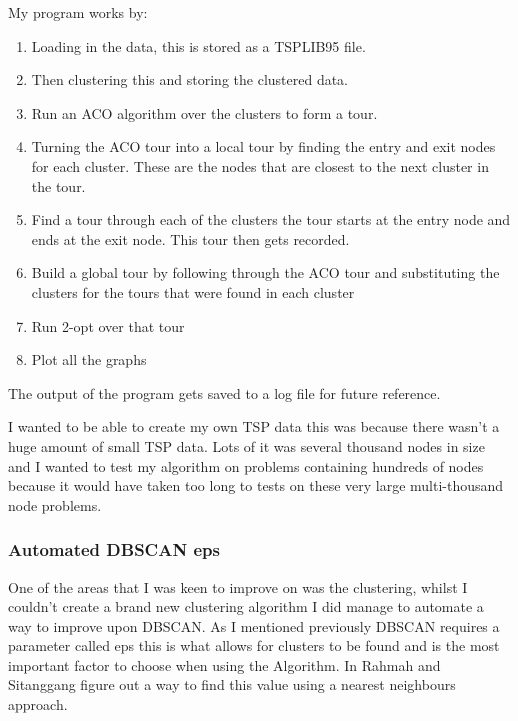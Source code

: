 My program works by:
\begin{enumerate}
    \item Loading in the data, this is stored as a TSPLIB95 file.
    \item Then clustering this and storing the clustered data.
    \item Run an ACO algorithm over the clusters to form a tour.
    \item Turning the ACO tour into a local tour by finding the entry and exit nodes for each cluster. These are the nodes that are closest to the next cluster in the tour.
    \item Find a tour through each of the clusters the tour starts at the entry node and ends at the exit node. This tour then gets recorded.
    \item Build a global tour by following through the ACO tour and substituting the clusters for the tours that were found in each cluster
    \item Run 2-opt over that tour
    \item Plot all the graphs
\end{enumerate}

The output of the program gets saved to a log file for future reference.

I wanted to be able to create my own TSP data this was because there wasn't a huge amount of small TSP data. Lots of it was several thousand nodes in size and I wanted to test my algorithm on problems containing hundreds of nodes because it would have taken too long to tests on these very large multi-thousand node problems.

\subsubsection{Automated DBSCAN eps}

One of the areas that I was keen to improve on was the clustering, whilst I couldn't create a brand new clustering algorithm I did manage to automate a way to improve upon DBSCAN. As I mentioned previously DBSCAN requires a parameter called eps this is what allows for clusters to be found and is the most important factor to choose when using the Algorithm. In \cite{optimal_eps_value_DBSCAN} Rahmah and Sitanggang figure out a way to find this value using a nearest neighbours approach.

